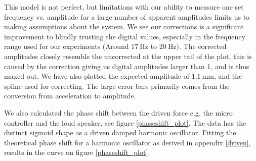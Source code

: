 \documentclass[12pt,oneside,a4paper]{article}
\numberwithin{equation}{section}
\begin{document}
{{{{\begin{figure}[h]
\begin{subfigure}[t]{0.49\textwidth}
	\end{subfigure}
\end{figure}
This model is not perfect, but limitations with our ability to measure one set frequency vs. amplitude for a large number of apparent amplitudes limits us to making assumptions about the system. We see our corrections is a significant improvement to blindly trusting the digital values, especially in the frequency range used for our experiments (Around $\SI{17}{\hertz}$ to $\SI{20}{\hertz}$). The corrected amplitudes closely resemble the uncorrected at the upper tail of the plot, this is caused by the correction giving us digital amplitudes larger than 1, and is thus maxed out. We have also plotted the expected amplitude of $\SI{1.1}{\mm}$, and the spline used for correcting. The large error bars primarily comes from the conversion from acceleration to amplitude.

We also calculated the phase shift between the driven force e.g. the micro controller and the loud speaker, see figure \ref{phaseshift_plot}. The data has the distinct sigmoid shape as a driven damped harmonic oscillator. Fitting the theoretical phase shift for a harmonic oscillator as derived in appendix \ref{driven}, results in the curve on figure \ref{phaseshift_plot}.
 
\begin{figure}[h]
	\centering
	\begin{subfigure}[t]{0.49\textwidth}
		

\end{subfigure}
\end{figure}}}}}
\end{document}
